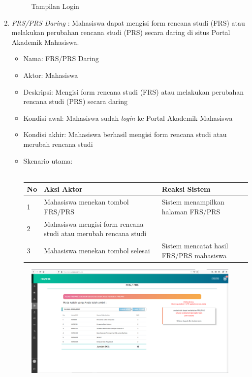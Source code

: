 \begin{enumerate}
\begin{figure}[H]
				\caption{Tampilan Login} 
				\label{fig:pam_login}
			\end{figure}
	\item \textit{FRS/PRS Daring} : 
    Mahasiswa dapat mengisi form rencana studi (FRS) atau melakukan perubahan rencana studi (PRS) secara daring di situs Portal Akademik Mahasiswa.
    \begin{itemize}
			\item Nama: FRS/PRS Daring
			\item Aktor: Mahasiswa
			\item Deskripsi: Mengisi form rencana studi (FRS) atau melakukan perubahan rencana studi (PRS) secara daring
			\item Kondisi awal: Mahasiswa sudah \textit{login} ke Portal Akademik Mahasiswa
			\item Kondisi akhir: Mahasiswa berhasil mengisi form rencana studi atau merubah rencana studi 
			\item Skenario utama: \\ \\
        \begin{tabular}{|p{0.5cm} |p{6cm}| p{6cm}|}
        \hline
            No & Aksi Aktor &  Reaksi Sistem \\ \hline     
            1 & Mahasiswa menekan tombol FRS/PRS & Sistem menampilkan halaman FRS/PRS \\ \hline 
            2 & Mahasiswa mengisi form rencana studi atau merubah rencana studi & \\ \hline 
            3 & Mahasiswa menekan tombol selesai & Sistem mencatat hasil FRS/PRS mahasiswa \\ \hline 
        \end{tabular}
    \end{itemize}
     \begin{figure}[H]
				\centering
				\includegraphics[scale=0.3]{DokumenSkripsi/Gambar/frs.PNG}

\end{figure}
\end{enumerate}

